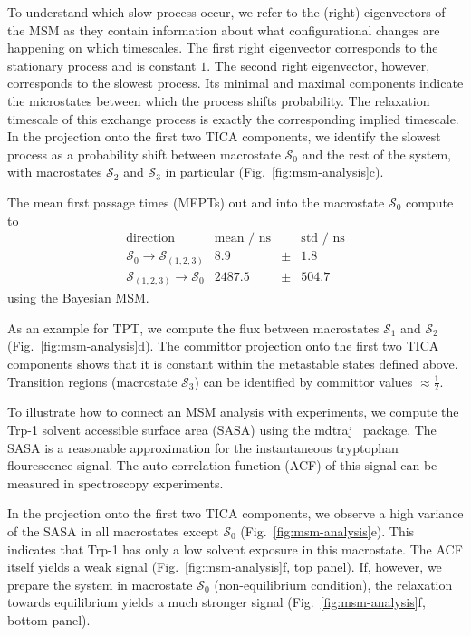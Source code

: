 \documentclass[9pt,tutorial]{livecoms}
\begin{document}
To understand which slow process occur, we refer to the (right) eigenvectors of the MSM as they contain information about what configurational changes are happening on which timescales. The first right eigenvector corresponds to the stationary process and is constant $1$. The second right eigenvector, however, corresponds to the slowest process. Its minimal and maximal components indicate the microstates between which the process shifts probability. The relaxation timescale of this exchange process is exactly the corresponding implied timescale. In the projection onto the first two TICA components, we identify the slowest process as a probability shift between macrostate $\mathcal{S}_0$ and the rest of the system, with macrostates $\mathcal{S}_2$ and $\mathcal{S}_3$ in particular (Fig.~\ref{fig:msm-analysis}c).

The mean first passage times (MFPTs) out and into the macrostate $\mathcal{S}_0$ compute to
\[ \begin{array}{crcr}
\textrm{direction} & \textrm{mean / ns} && \textrm{std / ns} \\
\hline
\mathcal{S}_0 \to \mathcal{S}_{(1,2,3)} & 8.9 & \pm & 1.8 \\
\mathcal{S}_{(1,2,3)} \to \mathcal{S}_0 & 2487.5 & \pm &  504.7
\end{array}\]
using the Bayesian MSM.

As an example for TPT, we compute the flux between macrostates $\mathcal{S}_1$ and $\mathcal{S}_2$ (Fig.~\ref{fig:msm-analysis}d). The committor projection onto the first two TICA components shows that it is constant within the metastable states defined above. Transition regions (macrostate $\mathcal{S}_3$) can be identified by committor values $\approx \frac{1}{2}$.

To illustrate how to connect an MSM analysis with experiments, we compute the Trp-1 solvent accessible surface area (SASA) using the mdtraj~\cite{mdtraj} package. The SASA is a reasonable approximation for the instantaneous tryptophan flourescence signal. The auto correlation function (ACF) of this signal can be measured in spectroscopy experiments.

In the projection onto the first two TICA components, we observe a high variance of the SASA in all macrostates except $\mathcal{S}_0$ (Fig.~\ref{fig:msm-analysis}e). This indicates that Trp-1 has only a low solvent exposure in this macrostate. The ACF itself yields a weak signal (Fig.~\ref{fig:msm-analysis}f, top panel). If, however, we prepare the system in macrostate $\mathcal{S}_0$ (non-equilibrium condition), the relaxation towards equilibrium yields a much stronger signal (Fig.~\ref{fig:msm-analysis}f, bottom panel).
\end{document}
